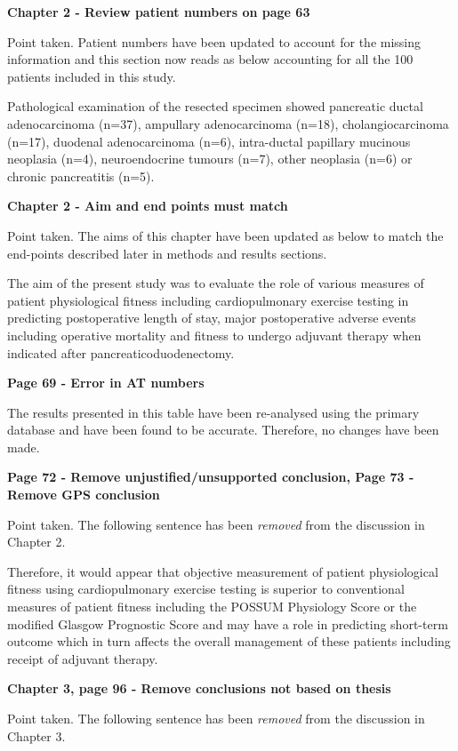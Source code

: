 \textbf{Chapter 2 - Review patient numbers on page 63}
	
	Point taken. Patient numbers have been updated to account for the missing information and this section now reads as below accounting for all the 100 patients included in this study.
	
	Pathological examination of the resected specimen showed pancreatic ductal adenocarcinoma (n=37), ampullary adenocarcinoma (n=18), cholangiocarcinoma (n=17), duodenal adenocarcinoma (n=6), intra-ductal papillary mucinous neoplasia (n=4), neuroendocrine tumours (n=7), other neoplasia (n=6) or chronic pancreatitis (n=5).
	
\textbf{Chapter 2 - Aim and end points must match }
	
	Point taken. The aims of this chapter have been updated as below to match the end-points described later in methods and results sections. 
	
	The aim of the present study was to evaluate the role of various measures of patient physiological fitness including cardiopulmonary exercise testing in predicting postoperative length of stay, major postoperative adverse events including operative mortality and fitness to undergo adjuvant therapy when indicated after pancreaticoduodenectomy.
	
\textbf{Page 69 - Error in AT numbers}
	
	The results presented in this table have been re-analysed using the primary database and have been found to be accurate. Therefore, no changes have been made.
	
\textbf{Page 72 - Remove unjustified/unsupported conclusion, Page 73 - Remove GPS conclusion}
	
	Point taken. The following sentence has been \textit{removed} from the discussion in Chapter 2.
	
	Therefore, it would appear that objective measurement of patient physiological fitness using cardiopulmonary exercise testing is superior to conventional measures of patient fitness including the POSSUM Physiology Score or the modified Glasgow Prognostic Score and may have a role in predicting short-term outcome which in turn affects the overall management of these patients including receipt of adjuvant therapy.
	
\textbf{Chapter 3, page 96 - Remove conclusions not based on thesis}
	
	Point taken. The following sentence has been \textit{removed} from the discussion in Chapter 3.
	
